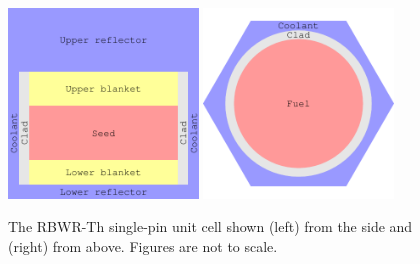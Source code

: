 \documentclass[11pt]{article}
\begin{document}
\appendix



\clearpage
\begin{figure}[p]
  \centering
  \includegraphics[width=0.45\textwidth, trim=0 0 0 0, clip]{./img/Th-xportSide.pdf}
  \hspace{0.1in}
  \includegraphics[width=0.45\textwidth, trim=0 0 0 0, clip]{./img/Th-xportTop.pdf}
  \caption{The RBWR-Th single-pin unit cell shown (left) from the side and (right) from above. Figures are not to scale.}
  \label{fig:xport}
\end{figure}
\end{document}
